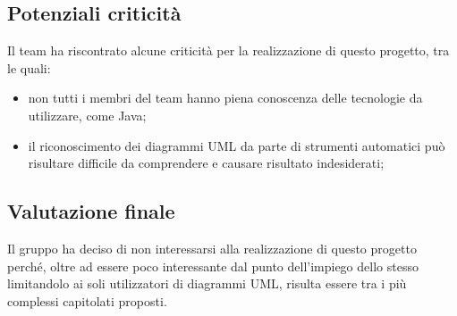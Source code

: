 \documentclass[../StudioDiFattibilita.tex]{subfiles}
\begin{document}
		\subsection{Potenziali criticità}
		Il team ha riscontrato alcune criticità per la realizzazione di questo progetto, tra le quali:
        	\begin{itemize}
        		\item non tutti i membri del team hanno piena conoscenza delle tecnologie da utilizzare, come Java;
        		\item il riconoscimento dei diagrammi UML da parte di strumenti automatici può risultare difficile da comprendere e causare risultato indesiderati;
        	\end{itemize}

	\subsection{Valutazione finale}  
	Il gruppo ha deciso di non interessarsi alla realizzazione di questo progetto perché, oltre ad essere poco interessante dal punto dell'impiego dello stesso limitandolo ai soli utilizzatori di diagrammi UML, risulta essere tra i più complessi capitolati proposti.
	
\end{document}
